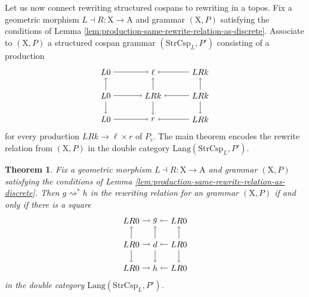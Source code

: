 \documentclass{amsart}
\newcommand{\A}{\cat{A}}
\newcommand{\X}{\cat{X}}
\newcommand{\StrCsp}{\cat{StrCsp}}
\newcommand{\Lang}{\mathrm{Lang}}
\newcommand{\cat}[1]{\mathrm{#1}}
\newcommand{\from}{\colon}
\newcommand{\deriv}[2]{#1 \rightsquigarrow^\ast #2}
\newtheorem{theorem}{Theorem}[section]
\theoremstyle{remark}
\theoremstyle{definition}
\begin{document}
Let us now connect rewriting structured cospans to rewriting in a
topos. Fix a geometric morphism $ L \dashv R \from \X \to \A $ and
grammar $ ( \X , P ) $ satisfying the conditions of Lemma
\ref{lem:production-same-rewrite-relation-as-discrete}.  Associate to
$ ( \X , P ) $ a structured cospan grammar $ ( \StrCsp_L , P' ) $
consisting of a production
%
\[
  \begin{tikzpicture}
    \node (1) at (0,2) {$ L 0 $};
    \node (2) at (2,2) {$ \ell $};
    \node (3) at (4,2) {$ LRk $};
    \node (4) at (0,1) {$ L 0 $};
    \node (5) at (2,1) {$ LRk $};
    \node (6) at (4,1) {$ LRk $};
    \node (7) at (0,0) {$ L 0 $};
    \node (8) at (2,0) {$ r $};
    \node (9) at (4,0) {$ LRk $};
    \draw [->] (1) to node [] {\scriptsize{$  $}} (2);
    \draw [->] (3) to node [] {\scriptsize{$  $}} (2);
    \draw [->] (4) to node [] {\scriptsize{$  $}} (5);
    \draw [->] (6) to node [] {\scriptsize{$  $}} (5);
    \draw [->] (7) to node [] {\scriptsize{$  $}} (8);
    \draw [->] (9) to node [] {\scriptsize{$  $}} (8);
    \draw [->] (4) to node [] {\scriptsize{$  $}} (1);
    \draw [->] (4) to node [] {\scriptsize{$  $}} (7);
    \draw [->] (5) to node [] {\scriptsize{$  $}} (2);
    \draw [->] (5) to node [] {\scriptsize{$  $}} (8);
    \draw [->] (6) to node [] {\scriptsize{$  $}} (3);
    \draw [->] (6) to node [] {\scriptsize{$  $}} (9);
  \end{tikzpicture}
\]
% 
for every production $ LRk \to \ell \times r $ of $ P_{\flat} $. The
main theorem encodes the rewrite relation from $ ( \X , P ) $ in the
double category $ \Lang ( \StrCsp_L , P' ) $.

\begin{theorem} \label{thm:inductive-rewriting}
  Fix a geometric morphism $ L \dashv R \from \X \to \A $ and grammar
  $ ( \X , P ) $ satisfying the conditions of Lemma
  \ref{lem:production-same-rewrite-relation-as-discrete}. Then
  $ \deriv{g}{h} $ in the rewriting relation for an grammar
  $ ( \X , P ) $ if and only if there is a square
  \[
    \begin{tikzpicture}
      \node (1t) at (0,2) {$ LR 0 $};
      \node (2t) at (1,2) {$ g $};
      \node (3t) at (2,2) {$ LR 0 $};
      \node (1m) at (0,1) {$ LR 0 $};
      \node (2m) at (1,1) {$ d $};
      \node (3m) at (2,1) {$ LR 0 $};
      \node (1b) at (0,0) {$ LR 0 $};
      \node (2b) at (1,0) {$ h $};
      \node (3b) at (2,0) {$ LR 0 $};
      \draw [->] (1t) to node [] {\scriptsize{$  $}} (2t);
      \draw [->] (3t) to node [] {\scriptsize{$  $}} (2t);
      \draw [->] (1m) to node [] {\scriptsize{$  $}} (2m);
      \draw [->] (3m) to node [] {\scriptsize{$  $}} (2m);
      \draw [->] (1b) to node [] {\scriptsize{$  $}} (2b);
      \draw [->] (3b) to node [] {\scriptsize{$  $}} (2b);
      \draw [->] (1m) to node [] {\scriptsize{$  $}} (1t);
      \draw [->] (1m) to node [] {\scriptsize{$  $}} (1b);
      \draw [->] (2m) to node [] {\scriptsize{$  $}} (2t);
      \draw [->] (2m) to node [] {\scriptsize{$  $}} (2b);
      \draw [->] (3m) to node [] {\scriptsize{$  $}} (3t);
      \draw [->] (3m) to node [] {\scriptsize{$  $}} (3b);
    \end{tikzpicture}
  \]
  in the double category $ \Lang ( \StrCsp_L , P' ) $.
\end{theorem}
\end{document}
